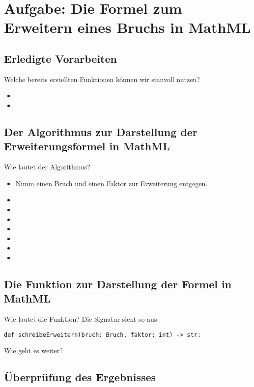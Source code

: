 \section{Aufgabe: Die Formel zum Erweitern eines Bruchs in MathML}

\subsection*{Erledigte Vorarbeiten}

Welche bereits erstellten Funktionen können wir sinnvoll nutzen?

\begin{itemize}[itemsep=2ex]
	\item 
	\item
\end{itemize}

\subsection*{Der Algorithmus zur Darstellung der Erweiterungsformel in MathML}

Wie lautet der Algorithmus?

\begin{itemize}[itemsep=2ex]
	\item Nimm einen Bruch und einen Faktor zur Erweiterung entgegen.
	\item 
	\item 
	\item 
	\item 
	\item 
	\item 
	\item 
\end{itemize}

\subsection*{Die Funktion zur Darstellung der Formel in MathML}

Wie lautet die Funktion? Die Signatur sieht so aus:

\lstset{style=syntaxPython}
\begin{lstlisting}
def schreibeErweitern(bruch: Bruch, faktor: int) -> str:
\end{lstlisting}

Wie geht es weiter?

\subsection*{Überprüfung des Ergebnisses}


